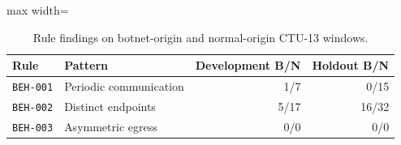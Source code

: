 \begin{table}[htbp]
\centering
\caption{Rule findings on botnet-origin and normal-origin CTU-13 windows.}
\label{tab:ctu13-rules}
\small
\begin{adjustbox}{max width=\columnwidth}
\begin{tabular}{llrr}
\toprule
Rule & Pattern & Development B/N & Holdout B/N \\
\midrule
\texttt{BEH-001} & Periodic communication & 1/7 & 0/15 \\
\texttt{BEH-002} & Distinct endpoints & 5/17 & 16/32 \\
\texttt{BEH-003} & Asymmetric egress & 0/0 & 0/0 \\
\bottomrule
\end{tabular}
\end{adjustbox}
\par{}
\end{table}
